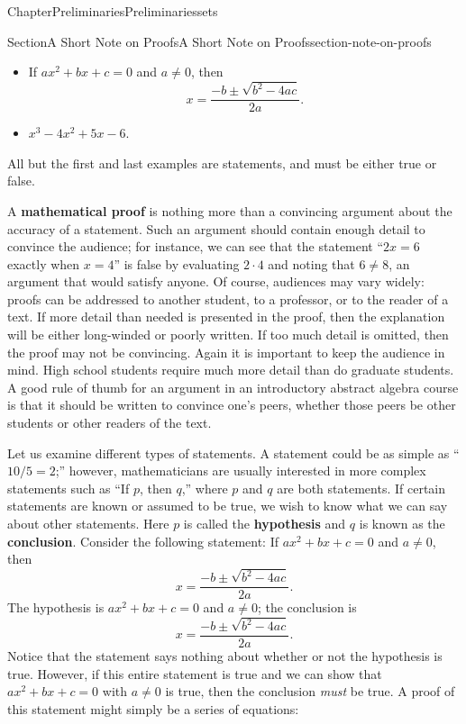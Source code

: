 \documentclass[oneside,10pt,]{book}
\newcommand{\terminology}[1]{\textbf{#1}}
\numberwithin{equation}{section}
\begin{document}
\begin{chapterptx}{Chapter}{Preliminaries}{}{Preliminaries}{}{}{sets}
\begin{sectionptx}{Section}{A Short Note on Proofs}{}{A Short Note on Proofs}{}{}{section-note-on-proofs}
\begin{introduction}{}
\begin{itemize}[label=\textbullet]
\item{}If \(ax^2 + bx + c = 0\) and \(a \neq 0\), then%
\begin{equation*}
x = \frac{-b \pm \sqrt{b^2 - 4ac}}{2a}\text{.}
\end{equation*}
%
\item{}\(x^3 - 4x^2 + 5 x - 6\).%
\end{itemize}
All but the first and last examples are statements, and must be either true or false.%
\par
A \terminology{mathematical proof} is nothing more than a convincing argument about the accuracy  of a statement. Such an argument should contain enough detail to convince the audience; for instance, we can see that the statement ``\(2x = 6\) exactly when \(x = 4\)'' is false by evaluating \(2 \cdot 4\) and noting that \(6 \neq 8\), an argument that would satisfy anyone. Of course, audiences may vary widely: proofs can be addressed to another student, to a professor, or to the reader of a text.  If more detail than  needed is presented in the proof, then the  explanation will be either long-winded or poorly written.  If too much detail is omitted, then the proof may  not be convincing.  Again it is important to keep the audience in mind.  High school students require much more detail than do graduate students.  A good rule of thumb for an argument in an introductory abstract algebra course is that it should be written to convince one's peers, whether those peers be other students or other readers of the text.%
\par
Let us examine different types of statements.  A statement could be as simple as ``\(10/5 = 2\);'' however, mathematicians are usually interested in more complex statements such as ``If \(p\), then \(q\),'' where \(p\) and \(q\) are both statements.  If certain statements are known or assumed to be true, we wish to know what we can say about other statements.  Here \(p\) is called the \terminology{hypothesis} and \(q\) is known as the \terminology{conclusion}.  Consider the following statement: If \(ax^2 + bx + c = 0\) and \(a \neq 0\), then%
\begin{equation*}
x = \frac{-b \pm \sqrt{b^2 - 4ac}}{2a}\text{.}
\end{equation*}
The hypothesis is \(ax^2 + bx + c = 0\) and \(a \neq 0\); the conclusion is%
\begin{equation*}
x = \frac{-b \pm \sqrt{b^2 - 4ac}}{2a}\text{.}
\end{equation*}
Notice that the  statement says nothing about whether or not the hypothesis is true. However, if this entire statement is true and we can show that \(ax^2 + bx + c = 0\) with \(a \neq 0\) is true, then the conclusion \emph{must} be true.  A proof of this statement might simply be a series of equations:%

\end{introduction}
\end{sectionptx}
\end{chapterptx}
\end{document}
